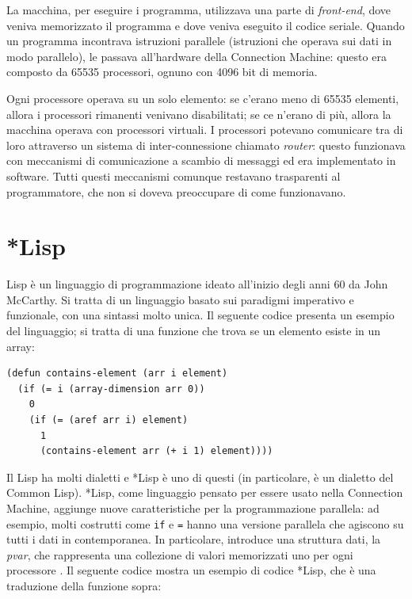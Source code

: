 \documentclass[12pt,a4paper,openright,twoside]{report}
\begin{document}
La macchina, per eseguire i programma, utilizzava una parte di \textit{front-end}, dove veniva memorizzato il programma e dove veniva eseguito il codice seriale. Quando un programma incontrava istruzioni parallele (istruzioni che operava sui dati in modo parallelo), le passava all'hardware della Connection Machine: questo era composto da 65535 processori, ognuno con 4096 bit di memoria.

Ogni processore operava su un solo elemento: se c'erano meno di 65535 elementi, allora i processori rimanenti venivano disabilitati; se ce n'erano di più, allora la macchina operava con processori virtuali. I processori potevano comunicare tra di loro attraverso un sistema di inter-connessione chiamato \textit{router}: questo funzionava con meccanismi di comunicazione a scambio di messaggi ed era implementato in software. Tutti questi meccanismi comunque restavano trasparenti al programmatore, che non si doveva preoccupare di come funzionavano.

\section{*Lisp}

Lisp è un linguaggio di programmazione ideato all'inizio degli anni 60 da John McCarthy. Si tratta di un linguaggio basato sui paradigmi imperativo e funzionale, con una sintassi molto unica. Il seguente codice presenta un esempio del linguaggio; si tratta di una funzione che trova se un elemento esiste in un array:

\newpage

\begin{lstlisting}[style=mystyle,caption={Esempio di codice Lisp. Questa funzione implementa la ricerca nell'array in maniera ricorsiva, in concordanza con il paradigma funzionale.}]
(defun contains-element (arr i element)
  (if (= i (array-dimension arr 0))
    0
    (if (= (aref arr i) element)
      1
      (contains-element arr (+ i 1) element))))
\end{lstlisting}

Il Lisp ha molti dialetti e *Lisp è uno di questi (in particolare, è un dialetto del Common Lisp). *Lisp, come linguaggio pensato per essere usato nella Connection Machine, aggiunge nuove caratteristiche per la programmazione parallela: ad esempio, molti costrutti come \verb|if| e \verb|=| hanno una versione parallela che agiscono su tutti i dati in contemporanea. In particolare, introduce una struttura dati, la \textit{pvar}, che rappresenta una collezione di valori memorizzati uno per ogni processore \cite{starlisp}. Il seguente codice mostra un esempio di codice *Lisp, che è una traduzione della funzione sopra:
\end{document}
